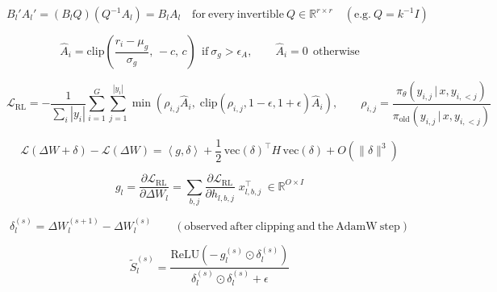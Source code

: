 \begin{equation}
  B_l' A_l' = \left(B_l Q\right)\left(Q^{-1} A_l\right) = B_l A_l \quad \mathrm{for\ every\ invertible}\ Q\in\mathbb{R}^{r\times r}\quad (\mathrm{e.g.}\ Q = k^{-1} I)
  \label{eq:eq_gauge}
\end{equation}

\begin{equation}
  \hat{A}_i = \mathrm{clip}\left(\frac{r_i - \mu_g}{\sigma_g},\,-c,\,c\right)\ \ \mathrm{if}\ \sigma_g > \epsilon_A,\qquad \hat{A}_i = 0\ \ \mathrm{otherwise}
  \label{eq:eq_grpo_adv}
\end{equation}

\begin{equation}
  \mathcal{L}_{\mathrm{RL}} = -\frac{1}{\sum_i |y_i|}\sum_{i=1}^{G}\sum_{j=1}^{|y_i|} \min\left(\rho_{i,j}\hat{A}_i,\; \mathrm{clip}\left(\rho_{i,j}, 1-\epsilon, 1+\epsilon\right)\hat{A}_i\right),\qquad \rho_{i,j} = \frac{\pi_\theta(y_{i,j}\,|\,x, y_{i,<j})}{\pi_{\mathrm{old}}(y_{i,j}\,|\,x, y_{i,<j})}
  \label{eq:eq_grpo_loss}
\end{equation}

\begin{equation}
  \mathcal{L}\left(\Delta W + \delta\right) - \mathcal{L}\left(\Delta W\right) = \left\langle g, \delta\right\rangle + \frac{1}{2}\,\mathrm{vec}(\delta)^{\top} H\,\mathrm{vec}(\delta) + O\left(\|\delta\|^3\right)
  \label{eq:eq_taylor}
\end{equation}

\begin{equation}
  g_l = \frac{\partial \mathcal{L}_{\mathrm{RL}}}{\partial \Delta W_l} = \sum_{b,j} \frac{\partial \mathcal{L}_{\mathrm{RL}}}{\partial h_{l,b,j}}\; x_{l,b,j}^{\top}\ \in \mathbb{R}^{O\times I}
  \label{eq:eq_eff_grad}
\end{equation}

\begin{equation}
  \delta_l^{(s)} = \Delta W_l^{(s+1)} - \Delta W_l^{(s)}\qquad (\mathrm{observed\ after\ clipping\ and\ the\ AdamW\ step})
  \label{eq:eq_step_delta}
\end{equation}

\begin{equation}
  \tilde{S}_l^{(s)} = \frac{\mathrm{ReLU}\left(-\,g_l^{(s)} \odot \delta_l^{(s)}\right)}{\delta_l^{(s)} \odot \delta_l^{(s)} + \epsilon}
  \label{eq:eq_raw_score}
\end{equation}

